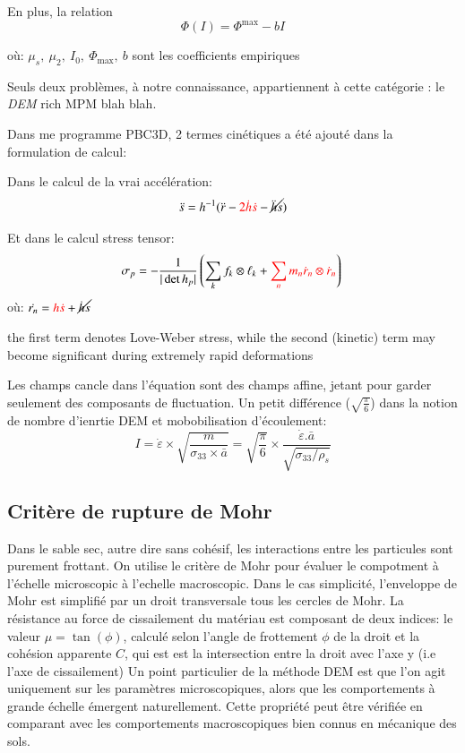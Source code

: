 \documentclass[5p,authoryear,square]{elsarticle}
\begin{document}
En plus, la relation 
\begin{equation}
\Phi(I) = \Phi^{\max} - bI
\label{phiI}
\end{equation}

où: $\mu_s,\ \mu_2,\ I_0,\ \Phi_{\text{max}},\ b $ sont les coefficients empiriques

Seuls deux problèmes, à notre connaissance, appartiennent à cette catégorie : le \emph{DEM} rich MPM blah blah.

Dans me programme PBC3D, 2 termes cinétiques a été ajouté  dans la formulation de calcul:


Dans le calcul de la vrai accélération: 
\begin{equation}
\ddot{s} = h^{-1}(\ddot{r} - \textcolor{red}{2\dot{h}\dot{s}} - \cancel{\ddot{h}s})
    \label{vraiAcc}
\end{equation}	


Et dans le calcul stress tensor: 
\begin{equation}
    \sigma_p = -\frac{1}{|\det h_p|} \left( \sum_k f_k \otimes \ell_k + \textcolor{red}{\sum_n m_n \dot{r}_n \otimes \dot{r}_n} \right) \\
    \label{contrainteDynamique}
\end{equation}	
    où: $\dot{r_n} = \textcolor{red}{h\dot{s}} + \cancel{\dot{h}s}$

the first term denotes Love-Weber stress, while the
second (kinetic) term may become significant during extremely rapid deformations

Les champs cancle dans l'équation sont des champs affine, jetant pour garder seulement des composants de fluctuation.
Un petit différence ($\sqrt{\frac{\pi}{6}}$) dans la notion de nombre d'ienrtie DEM et mobobilisation d'écoulement:
\begin{equation}
    I = \dot{\varepsilon} \times \sqrt{\frac{m}{\sigma_{33} \times \bar{a}}}
 = \sqrt{\frac{\pi}{6}} \times \frac{\dot{\varepsilon} .\bar{a}}{\sqrt{\sigma_{33}/\rho_s}}
    \label{comparerO}
\end{equation}



\subsection{Critère de rupture de Mohr} \label{Mohr}
Dans le sable sec, autre dire sans cohésif, les interactions entre les particules sont purement frottant. 
On utilise le critère de Mohr pour évaluer le compotment à l'échelle microscopic à l'echelle macroscopic.
Dans le cas simplicité, l'enveloppe de Mohr est simplifié par un droit transversale tous les cercles de Mohr.
La résistance au force de cissailement du matériau est composant de deux indices: le valeur $\mu = \tan(\phi)$, calculé selon l'angle de frottement $\phi$ de la droit et la cohésion apparente $C$, qui est est la intersection entre la droit avec l'axe y (i.e l'axe de cissailement)
Un point particulier de la méthode DEM est que l'on agit uniquement sur les paramètres microscopiques, alors que les comportements à grande échelle émergent naturellement.  
Cette propriété peut être vérifiée en comparant avec les comportements macroscopiques bien connus en mécanique des sols.  
\end{document}
